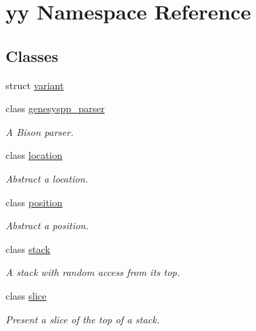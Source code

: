 \hypertarget{namespaceyy}{\section{yy Namespace Reference}
\label{namespaceyy}
}
\subsection*{Classes}
\begin{DoxyCompactItemize}
\item 
struct \hyperlink{structyy_1_1variant}{variant}
\item 
class \hyperlink{classyy_1_1genesyspp__parser}{genesyspp\-\_\-parser}
\begin{DoxyCompactList}\small\item\em A Bison parser. \end{DoxyCompactList}\item 
class \hyperlink{classyy_1_1location}{location}
\begin{DoxyCompactList}\small\item\em Abstract a location. \end{DoxyCompactList}\item 
class \hyperlink{classyy_1_1position}{position}
\begin{DoxyCompactList}\small\item\em Abstract a position. \end{DoxyCompactList}\item 
class \hyperlink{classyy_1_1stack}{stack}
\begin{DoxyCompactList}\small\item\em A stack with random access from its top. \end{DoxyCompactList}\item 
class \hyperlink{classyy_1_1slice}{slice}
\begin{DoxyCompactList}\small\item\em Present a slice of the top of a stack. \end{DoxyCompactList}\end{DoxyCompactItemize}
